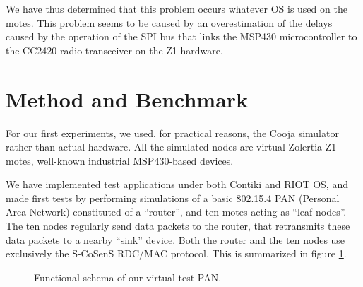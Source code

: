 \documentclass[conference]{IEEEtran}
\begin{document}
We have thus determined that this problem occurs whatever OS is used
on the motes. This problem seems to be caused by an overestimation
of the delays caused by the operation of the SPI bus that links
the MSP430 microcontroller to the CC2420 radio transceiver
on the Z1 hardware.



\section{Method and Benchmark}

For our first experiments, we used, for practical reasons, the Cooja
simulator rather than actual hardware. All the simulated nodes are
virtual Zolertia Z1 motes, well-known industrial MSP430-based devices.

We have implemented test applications under both Contiki and RIOT OS, and
made first tests by performing simulations of a basic 802.15.4 PAN
(Personal Area Network) constituted of a ``router'', and ten motes
acting as ``leaf nodes''. The ten nodes regularly send data packets to
the router, that retransmits these data packets to a nearby ``sink'' device.
Both the router and the ten nodes use exclusively the S-CoSenS RDC/MAC
protocol. This is summarized in figure \ref{FigPANtest}.

\begin{figure}[!h]
\centering
{}
\caption{Functional schema of our virtual test PAN.}
\label{FigPANtest}
\end{figure}
\end{document}
